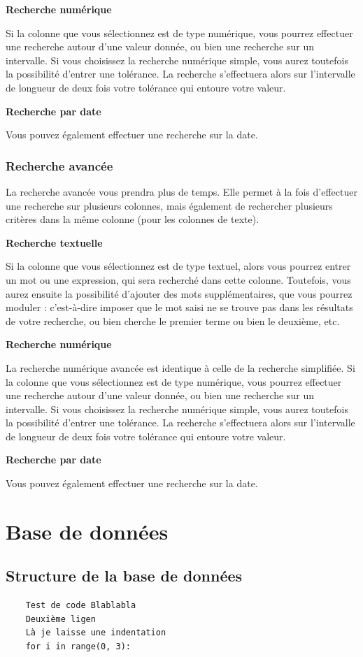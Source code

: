 \documentclass[12pt,a4paper]{article}
\begin{document}
        \medskip
        \textbf{Recherche numérique}
        
        Si la colonne que vous sélectionnez est de type numérique, vous pourrez effectuer une recherche autour d'une valeur donnée,
        ou bien une recherche sur un intervalle. Si vous choisissez la recherche numérique simple, vous aurez toutefois
        la possibilité d'entrer une tolérance. La recherche s'effectuera alors sur l'intervalle de longueur de deux fois votre tolérance
        qui entoure votre valeur.

        \medskip
        \textbf{Recherche par date}
        
        Vous pouvez également effectuer une recherche sur la date.

    \subsubsection{Recherche avancée}
        La recherche avancée vous prendra plus de temps. Elle permet à la fois d'effectuer une recherche sur plusieurs colonnes,
        mais également de rechercher plusieurs critères dans la même colonne (pour les colonnes de texte).

        \medskip
        \textbf{Recherche textuelle}

        Si la colonne que vous sélectionnez est de type textuel, alors vous pourrez entrer un mot ou une expression, qui sera recherché
        dans cette colonne. Toutefois, vous aurez ensuite la possibilité d'ajouter des mots supplémentaires, que vous pourrez moduler :
        c'est-à-dire imposer que le mot saisi ne se trouve pas dans les résultats de votre recherche, ou bien cherche le premier terme
        ou bien le deuxième, etc.
        
        \medskip
        \textbf{Recherche numérique}
        
        La recherche numérique avancée est identique à celle de la recherche simplifiée.
        Si la colonne que vous sélectionnez est de type numérique, vous pourrez effectuer une recherche autour d'une valeur donnée,
        ou bien une recherche sur un intervalle. Si vous choisissez la recherche numérique simple, vous aurez toutefois
        la possibilité d'entrer une tolérance. La recherche s'effectuera alors sur l'intervalle de longueur de deux fois votre tolérance
        qui entoure votre valeur.

        \medskip
        \textbf{Recherche par date}
        
        Vous pouvez également effectuer une recherche sur la date.






\section{Base de données}

\subsection{Structure de la base de données}

\begin{verbatim}
    Test de code Blablabla
    Deuxième ligen
    Là je laisse une indentation
    for i in range(0, 3):
\end{verbatim}
\end{document}
